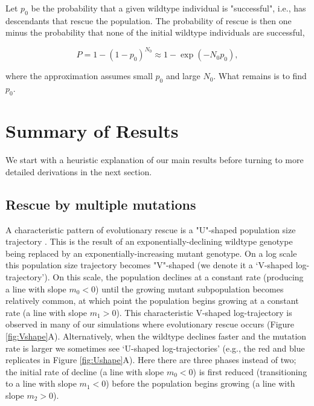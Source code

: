 \documentclass[9pt,twocolumn,twoside,lineno]{gsajnl}
\begin{document}
Let $p_0$ be the probability that a given wildtype individual is "successful", i.e., has descendants that rescue the population. 
The probability of rescue is then one minus the probability that none of the initial wildtype individuals are successful,

\begin{equation}\label{eq:Prescue}
P = 1-(1-p_0)^{N_0} \approx 1 - \exp \left(- N_0 p_0 \right),
\end{equation} 

\noindent where the approximation assumes small $p_0$ and large $N_0$. 
What remains is to find $p_0$.

\section{Summary of Results}
\label{sec:summary}

We start with a heuristic explanation of our main results before turning to more detailed derivations in the next section.

\subsection{Rescue by multiple mutations}

A characteristic pattern of evolutionary rescue is a "U"-shaped population size trajectory \citep[e.g.,][]{Orr2014}.
This is the result of an exponentially-declining wildtype genotype being replaced by an exponentially-increasing mutant genotype.
On a log scale this population size trajectory becomes "V"-shaped (we denote it a `V-shaped log-trajectory').
On this scale, the population declines at a constant rate (producing a line with slope $m_0<0$) until the growing mutant subpopulation becomes relatively common, at which point the population begins growing at a constant rate (a line with slope $m_1>0$).
This characteristic V-shaped log-trajectory is observed in many of our simulations where evolutionary rescue occurs (Figure \ref{fig:Vshape}A).
Alternatively, when the wildtype declines faster and the mutation rate is larger we sometimes see `U-shaped log-trajectories' (e.g., the red and blue replicates in Figure \ref{fig:Ushape}A).
Here there are three phases instead of two; the initial rate of decline (a line with slope $m_0<0$) is first reduced (transitioning to a line with slope $m_1<0$) before the population begins growing (a line with slope $m_2>0$).  
\end{document}
